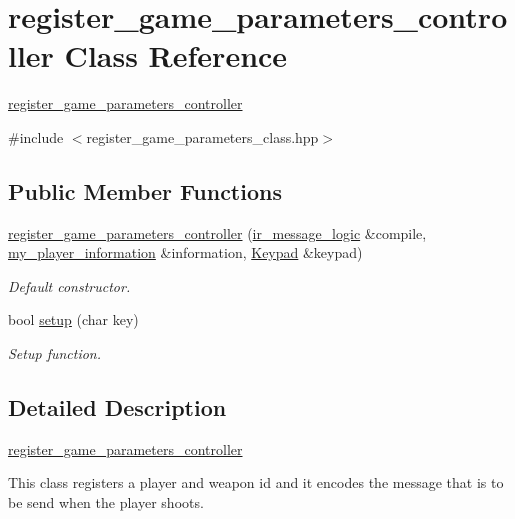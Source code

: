 \hypertarget{classregister__game__parameters__controller}{}\section{register\+\_\+game\+\_\+parameters\+\_\+controller Class Reference}
\label{classregister__game__parameters__controller}


\hyperlink{classregister__game__parameters__controller}{register\+\_\+game\+\_\+parameters\+\_\+controller}  




{\ttfamily \#include $<$register\+\_\+game\+\_\+parameters\+\_\+class.\+hpp$>$}

\subsection*{Public Member Functions}
\begin{DoxyCompactItemize}
\item 
\hyperlink{classregister__game__parameters__controller_a291e306ca9e214208d0145058af13eeb}{register\+\_\+game\+\_\+parameters\+\_\+controller} (\hyperlink{classir__message__logic}{ir\+\_\+message\+\_\+logic} \&compile, \hyperlink{classmy__player__information}{my\+\_\+player\+\_\+information} \&information, \hyperlink{class_keypad}{Keypad} \&keypad)
\begin{DoxyCompactList}\small\item\em Default constructor. \end{DoxyCompactList}\item 
bool \hyperlink{classregister__game__parameters__controller_a9599db32b65bd0839ae4037acfdadd95}{setup} (char key)
\begin{DoxyCompactList}\small\item\em Setup function. \end{DoxyCompactList}\end{DoxyCompactItemize}


\subsection{Detailed Description}
\hyperlink{classregister__game__parameters__controller}{register\+\_\+game\+\_\+parameters\+\_\+controller} 

This class registers a player and weapon id and it encodes the message that is to be send when the player shoots. 

